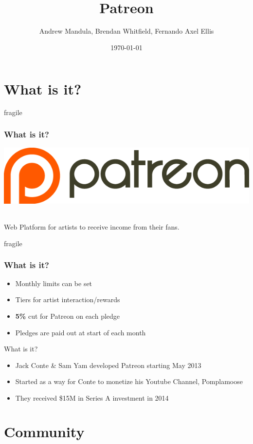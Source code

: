 \documentclass[10pt, compress]{beamer}
\title{Patreon}
\subtitle{}
\date{\today}
\author{Andrew Mandula, Brendan Whitfield, Fernando Axel Ellis}
\institute{Apoyar y comprometerse con los creadores que te quieres}
\begin{document}
\maketitle

\section{What is it?}
\begin{frame}{fragile}
\frametitle{What is it?}
\includegraphics[width=\textwidth]{images/patreonlogo.png} \\ \\
\begin{center}Web Platform for artists to receive income from their fans.\end{center}
\end{frame}

\begin{frame}{fragile}
\frametitle{What is it?}

    \begin{itemize}
        \item Monthly limits can be set
        \item Tiers for artist interaction/rewards
        \item \textbf{5\%} cut for Patreon on each pledge
        \item Pledges are paid out at start of each month
    \end{itemize}

\end{frame}

\begin{frame}{What is it?}
    \begin{itemize}
        \item Jack Conte \& Sam Yam developed Patreon starting May 2013
        \item Started as a way for Conte to monetize his Youtube Channel, Pomplamoose
        \item They received \$15M in Series A investment in 2014
    \end{itemize}
\end{frame}

\section{Community}
\end{document}

